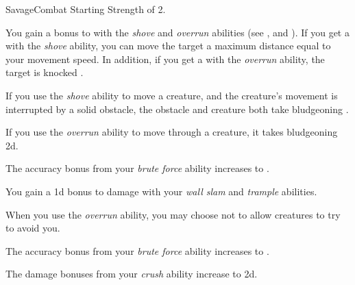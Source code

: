     \begin{feat}{Savage}{Combat}
        \featpre Starting Strength of 2.

         You gain a  bonus to  with the \textit{shove} and \textit{overrun} abilities (see , and ).
        If you get a  with the \textit{shove} ability, you can move the target a maximum distance equal to your movement speed.
        In addition, if you get a  with the \textit{overrun} ability, the target is knocked .

         If you use the \textit{shove} ability to move a creature, and the creature's movement is interrupted by a solid obstacle, the obstacle and creature both take bludgeoning .

         If you use the \textit{overrun} ability to move through a creature, it takes bludgeoning  \minus2d.

         The accuracy bonus from your \textit{brute force} ability increases to .

         You gain a \plus1d bonus to damage with your \textit{wall slam} and \textit{trample} abilities.

         When you use the \textit{overrun} ability, you may choose not to allow creatures to try to avoid you.

         The accuracy bonus from your \textit{brute force} ability increases to .

         The damage bonuses from your \textit{crush} ability increase to \plus2d.
    \end{feat}

